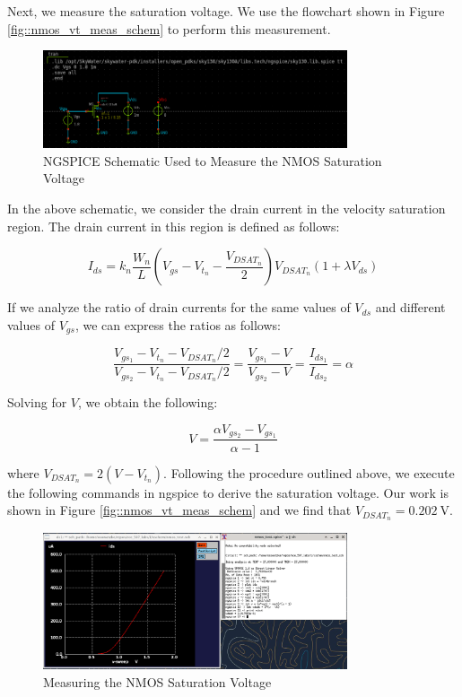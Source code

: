 \documentclass{article}
\begin{document}
	Next, we measure the saturation voltage. We use the flowchart shown in Figure \ref{fig::nmos_vt_meas_schem} to perform this measurement.
	
	\begin{figure}[H]
		\centerline{\includegraphics[width=0.8\textwidth]{nmos_vt_meas_schem.png}}
		\caption{NGSPICE Schematic Used to Measure the NMOS Saturation Voltage}
		\label{fig::nmos_vdsat_meas_schem}
	\end{figure}
	
	 \noindent In the above schematic, we consider the drain current in the velocity saturation region. The drain current in this region is defined as follows:
	
	\begin{equation}
		\label{eq::nmos_sat_current}
		I_{ds} = k_n\frac{W_n}{L}\left(V_{gs} - V_{t_n} - \frac{V_{DSAT_n}}{2}\right)V_{DSAT_n}(1 + {\lambda}V_{ds})
	\end{equation}
	
	\noindent If we analyze the ratio of drain currents for the same values of $V_{ds}$ and different values of $V_{gs}$, we can express the ratios as follows:
	
	\begin{equation}
		\frac{V_{gs_1} - V_{t_n} - V_{DSAT_n}/2}{V_{gs_2} - V_{t_n} - V_{DSAT_n}/2} = \frac{V_{gs_1} - V}{V_{gs_2} - V} = \frac{I_{ds_1}}{I_{ds_2}} = \alpha
	\end{equation}
	
	\noindent Solving for $V$, we obtain the following:
	
	\begin{equation}
		V = \frac{{\alpha}V_{gs_2} - V_{gs_1}}{\alpha - 1}
	\end{equation}
	
	\noindent where $V_{DSAT_n} = 2(V - V_{t_n})$. Following the procedure outlined above, we execute the following commands in ngspice to derive the saturation voltage. Our work is shown in Figure \ref{fig::nmos_vt_meas_schem} and we find that $V_{DSAT_n} = 0.202\ \text{V}$.
	
	\begin{figure}[H]
		\centerline{\includegraphics[width=0.8\textwidth]{nmos_vdsat_meas.png}}
		\caption{Measuring the NMOS Saturation Voltage}
		\label{fig::nmos_vdsat_meas}
	\end{figure}
	
\end{document}
